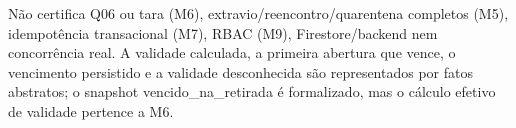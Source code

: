 Não certifica Q06 ou tara (M6), extravio/reencontro/quarentena completos (M5), idempotência transacional (M7), RBAC (M9), Firestore/backend nem concorrência real. A validade calculada, a primeira abertura que vence, o vencimento persistido e a validade desconhecida são representados por fatos abstratos; o snapshot vencido\_na\_retirada é formalizado, mas o cálculo efetivo de validade pertence a M6.
